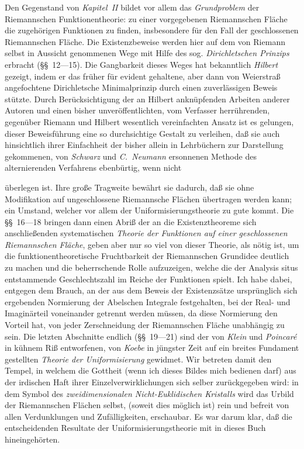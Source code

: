 \documentclass{article}
\begin{document}
Den Gegenstand von \emph{Kapitel~II} bildet vor allem das \emph{Grundproblem} der Riemannschen Funktionentheorie: zu einer vorgegebenen Riemannschen Fläche die zugehörigen Funktionen zu finden, insbesondere für den Fall der geschlossenen Riemannschen Fläche. Die Existenzbeweise werden hier auf dem von Riemann selbst in Aussicht genommenen Wege mit Hilfe des sog. \emph{Dirichletschen Prinzips} erbracht (§§~12---15). Die Gangbarkeit dieses Weges hat bekanntlich \emph{Hilbert} gezeigt, indem er das früher für evident gehaltene, aber dann von Weierstraß angefochtene Dirichletsche Minimalprinzip durch einen zuverlässigen Beweis stützte. Durch Berücksichtigung der an Hilbert anknüpfenden Arbeiten anderer Autoren und einen bisher unveröffentlichten, vom Verfasser herrührenden, gegenüber Riemann und Hilbert wesentlich vereinfachten Ansatz ist es gelungen, dieser Beweisführung eine so durchsichtige Gestalt zu verleihen, daß sie auch hinsichtlich ihrer Einfachheit der bisher allein in Lehrbüchern zur Darstellung gekommenen, von \emph{Schwarz} und \emph{C.~Neumann} ersonnenen Methode des alternierenden Verfahrens ebenbürtig, wenn nicht

überlegen ist. Ihre große Tragweite bewährt sie dadurch, daß sie ohne Modifikation auf ungeschlossene Riemannsche Flächen übertragen werden kann; ein Umstand, welcher vor allem der Uniformisierungstheorie zu gute kommt. Die §§~16---18 bringen dann einen Abriß der an die Existenztheoreme sich anschließenden systematischen \emph{Theorie der Funktionen auf einer geschlossenen Riemannschen Fläche}, geben aber nur so viel von dieser Theorie, als nötig ist, um die funktionentheoretische Fruchtbarkeit der Riemannschen Grundidee deutlich zu machen und die beherrschende Rolle aufzuzeigen, welche die der Analysis situs entstammende Geschlechtszahl im Reiche der Funktionen spielt. Ich habe dabei, entgegen dem Brauch, an der aus dem Beweis der Existenzsätze ursprünglich sich ergebenden Normierung der Abelschen Integrale festgehalten, bei der Real- und Imaginärteil voneinander getrennt werden müssen, da diese Normierung den Vorteil hat, von jeder Zerschneidung der Riemannschen Fläche unabhängig zu sein. Die letzten Abschnitte endlich (§§~19---21) sind der von \emph{Klein} und \emph{Poincaré} in kühnem Riß entworfenen, von \emph{Koebe} in jüngster Zeit auf ein breites Fundament gestellten \emph{Theorie der Uniformisierung} gewidmet. Wir betreten damit den Tempel, in welchem die Gottheit (wenn ich dieses Bildes mich bedienen darf) aus der irdischen Haft ihrer Einzelverwirklichungen sich selber zurückgegeben wird: in dem Symbol des \emph{zweidimensionalen Nicht-Euklidischen Kristalls} wird das Urbild der Riemannschen Flächen selbst, (soweit dies möglich ist) rein und befreit von allen Verdunklungen und Zufälligkeiten, erschaubar. Es war darum klar, daß die entscheidenden Resultate der Uniformisierungstheorie mit in dieses Buch hineingehörten.
\end{document}
